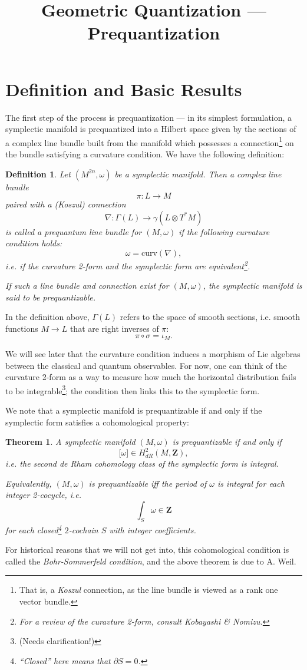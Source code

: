 \documentclass{tufte-handout}
\title{Geometric Quantization --- Prequantization}
\newtheorem{thrm}{Theorem}
\newtheorem{defn}{Definition}
\begin{document}
\section{Definition and Basic Results}
The first step of the process is prequantization --- in its simplest formulation, a symplectic manifold is prequantized into a Hilbert space given by the sections of a complex line bundle built from the manifold which possesses a connection\footnote{That is, a \emph{Koszul} connection, as the line bundle is viewed as a rank one vector bundle.} on the bundle satisfying a curvature condition. We have the following definition:
\begin{defn}
Let $(M^{2n},\omega)$ be a symplectic manifold. Then a complex line bundle
$$
\pi: L \to M
$$
paired with a (Koszul) connection
$$
\nabla: \Gamma(L) \to \gamma(L \otimes T^*M)
$$
is called a \emph{prequantum line bundle} for $(M,\omega)$ if the following curvature condition holds:
$$
\omega = \mathrm{curv}(\nabla),
$$
i.e. if the curvature 2-form and the symplectic form are equivalent\footnote{For a review of the curavture 2-form, consult Kobayashi \& Nomizu.}.

If such a line bundle and connection exist for $(M,\omega)$, the symplectic manifold is said to be \emph{prequantizable}.
\end{defn}
In the definition above, $\Gamma(L)$ refers to the space of smooth sections, i.e. smooth functions $M \to L$ that are right inverses of $\pi$:
$$
\pi \circ \sigma = \iota_M.
$$

We will see later that the curvature condition induces a morphism of Lie algebras between the classical and quantum observables. For now, one can think of the curvature 2-form as a way to measure how much the horizontal distribution fails to be integrable\footnote{(Needs clarification!)}; the condition then links this to the symplectic form. %

We note that a symplectic manifold is prequantizable if and only if the symplectic form satisfies a cohomological property:
\begin{thrm}
A symplectic manifold $(M,\omega)$ is prequantizable if and only if
$$
\biggl[\omega\biggr] \in H_{dR}^2(M,\mathbf{Z}),
$$
i.e. the second de Rham cohomology class of the symplectic form is integral.

Equivalently, $(M,\omega)$ is prequantizable iff the period of $\omega$ is integral for each integer 2-cocycle, i.e.
$$
\int_S \omega \in \mathbf{Z}
$$
for each closed\footnote{``Closed'' here means that $\partial S = 0$.} $2$-cochain $S$ with integer coefficients.
\end{thrm}
For historical reasons that we will not get into, this cohomological condition is called the \emph{Bohr-Sommerfeld condition}, and the above theorem is due to A. Weil.
\end{document}
